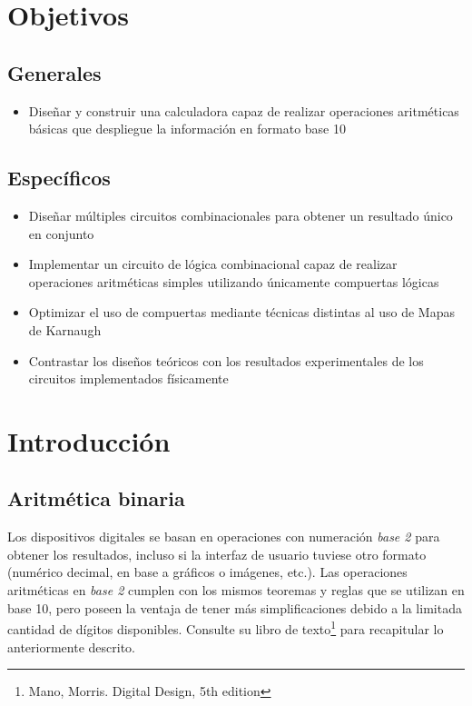 
\section*{Objetivos}
\subsection*{Generales}
\begin{itemize}
    \item Diseñar y construir una calculadora capaz de realizar operaciones aritméticas básicas que despliegue la información en formato base 10
\end{itemize}

\subsection*{Específicos}
\begin{itemize}
    \item Diseñar múltiples circuitos combinacionales para obtener un resultado único en conjunto
    \item Implementar un circuito de lógica combinacional capaz de realizar operaciones aritméticas simples utilizando únicamente compuertas lógicas
    \item Optimizar el uso de compuertas mediante técnicas distintas al uso de Mapas de Karnaugh
    \item Contrastar los diseños teóricos con los resultados experimentales de los circuitos implementados físicamente
\end{itemize}

\section{Introducción}

\subsection{Aritmética binaria}
Los dispositivos digitales se basan en operaciones con numeración \emph{base 2} para obtener los resultados, incluso si la interfaz de usuario tuviese otro 
formato (numérico decimal, en base a gráficos o imágenes, etc.). Las operaciones aritméticas en \emph{base 2} cumplen con los mismos teoremas y reglas que se
utilizan en base 10, pero poseen la ventaja de tener más simplificaciones debido a la limitada cantidad de dígitos disponibles. Consulte su libro de
texto\footnote{Mano, Morris. Digital Design, 5th edition} para recapitular lo anteriormente descrito.

